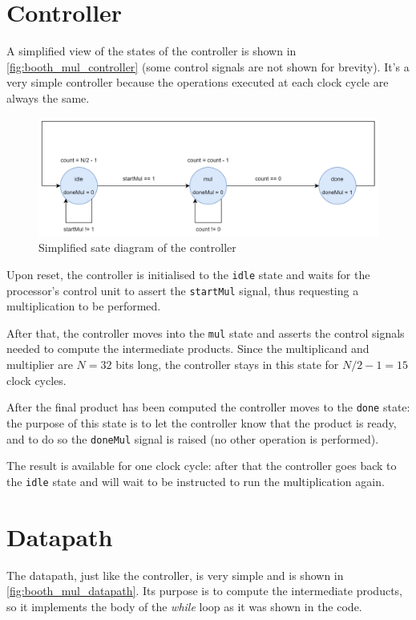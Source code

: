\section{Controller}
A simplified view of the states of the controller is shown in \autoref{fig:booth_mul_controller} (some control signals are not shown for brevity).
It's a very simple controller because the operations executed at each clock cycle are always the same.

\begin{figure}
    \centering
    \includegraphics[width=0.9\linewidth]{images/boothControllerSimplified.png}
    \caption{Simplified sate diagram of the controller}
    \label{fig:booth_mul_controller}
\end{figure}

Upon reset, the controller is initialised to the \texttt{idle} state and waits for the processor's control unit to assert the \texttt{startMul} signal, thus requesting a multiplication to be performed.

After that, the controller moves into the \texttt{mul} state and asserts the control signals needed to compute the intermediate products.
Since the multiplicand and multiplier are $N = 32$ bits long, the controller stays in this state for $N / 2 - 1 = 15$ clock cycles.

After the final product has been computed the controller moves to the \texttt{done} state: the purpose of this state is to let the controller know that the product is ready, and to do so the \texttt{doneMul} signal is raised (no other operation is performed).

The result is available for one clock cycle: after that the controller goes back to the \texttt{idle} state and will wait to be instructed to run the multiplication again.

\section{Datapath}
The datapath, just like the controller, is very simple and is shown in \autoref{fig:booth_mul_datapath}.
Its purpose is to compute the intermediate products, so it implements the body of the \textit{while} loop as it was shown in the code.

